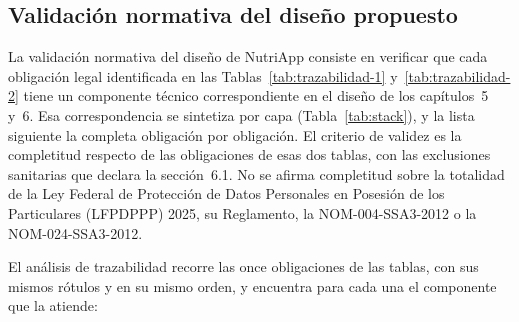 \documentclass[12pt, a4paper]{article}
\begin{document}
\subsection{Validación normativa del diseño propuesto}

La validación normativa del diseño de NutriApp consiste en verificar que
cada obligación legal identificada en las
Tablas~\ref{tab:trazabilidad-1} y~\ref{tab:trazabilidad-2} tiene un
componente técnico correspondiente en el diseño de los capítulos~5 y~6.
Esa correspondencia se sintetiza por capa (Tabla~\ref{tab:stack}), y la
lista siguiente la completa obligación por obligación. El criterio de
validez es la completitud respecto de las obligaciones de esas dos
tablas, con las exclusiones sanitarias que declara la sección~6.1. No se
afirma completitud sobre la totalidad de la Ley Federal de Protección de
Datos Personales en Posesión de los Particulares (LFPDPPP) 2025, su
Reglamento, la NOM-004-SSA3-2012 o la NOM-024-SSA3-2012.
 
El análisis de trazabilidad recorre las once obligaciones de las
tablas, con sus mismos rótulos y en su mismo orden, y encuentra para
cada una el componente que la atiende:
 
\end{document}
